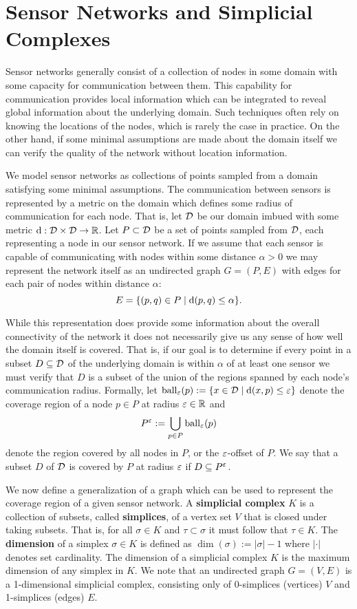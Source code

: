 \section{Sensor Networks and Simplicial Complexes} %
\label{sec:complexes}

Sensor networks generally consist of a collection of nodes in some domain with some capacity for communication between them.
This capability for communication provides local information which can be integrated to reveal global information about the underlying domain.
Such techniques often rely on knowing the locations of the nodes, which is rarely the case in practice.
On the other hand, if some minimal assumptions are made about the domain itself we can verify the quality of the network without location information.

We model sensor networks as collections of points sampled from a domain satisfying some minimal assumptions.
The communication between sensors is represented by a metric on the domain which defines some radius of communication for each node.
That is, let ${\mathcal{D}}$ be our domain imbued with some metric $\mathrm{d} : {\mathcal{D}}\times{\mathcal{D}}\to\mathbb{R}$.
Let $P\subset{\mathcal{D}}$ be a set of points sampled from ${\mathcal{D}}$, each representing a node in our sensor network.
If we assume that each sensor is capable of communicating with nodes within some distance $\alpha > 0$ we may represent the network itself as an undirected graph $G = (P, E)$ with edges for each pair of nodes within distance $\alpha$:
\[ E = \{(p, q)\in P\mid \mathrm{d}(p, q)\leq \alpha\}. \]

While this representation does provide some information about the overall connectivity of the network it does not necessarily give us any sense of how well the domain itself is covered.
That is, if our goal is to determine if every point in a subset $D\subseteq{\mathcal{D}}$ of the underlying domain is within $\alpha$ of at least one sensor we must verify that $D$ is a subset of the union of the regions spanned by each node's communication radius.
Formally, let $\mathrm{ball}_\varepsilon(p) := \{x\in{\mathcal{D}}\mid \mathrm{d}(x, p)\leq\varepsilon\}$ denote the coverage region of a node $p\in P$ at radius $\varepsilon\in\mathbb{R}$ and \[P^\varepsilon := \displaystyle\bigcup_{p\in P}\mathrm{ball}_\varepsilon(p)\] denote the region covered by all nodes in $P$, or the $\varepsilon$-offset of $P$.
We say that a subset $D$ of ${\mathcal{D}}$ is covered by $P$ at radius $\varepsilon$ if $D\subseteq P^\varepsilon$.

We now define a generalization of a graph which can be used to represent the coverage region of a given sensor network.
A \textbf{simplicial complex} $K$ is a collection of subsets, called \textbf{simplices}, of a vertex set $V$ that is closed under taking subsets.
That is, for all $\sigma\in K$ and $\tau\subset\sigma$ it must follow that $\tau\in K$.
The \textbf{dimension} of a simplex $\sigma\in K$ is defined as $\dim(\sigma) := |\sigma|-1$ where $|\cdot|$ denotes set cardinality.
The dimension of a simplicial complex $K$ is the maximum dimension of any simplex in $K$.
We note that an undirected graph $G = (V, E)$ is a 1-dimensional simplicial complex, consisting only of 0-simplices (vertices) $V$ and 1-simplices (edges) $E$.

